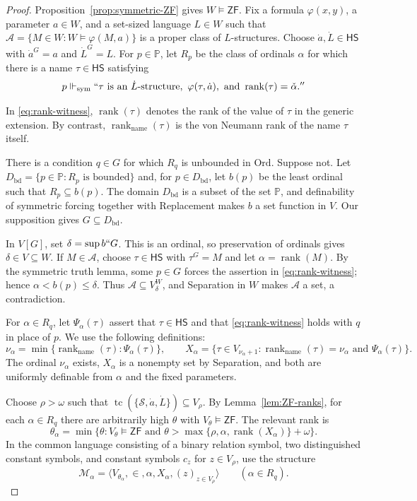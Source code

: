 \documentclass[11pt,a4paper]{amsart}
\newcommand{\ZF}{\mathsf{ZF}}
\newcommand{\HS}{\mathsf{HS}}
\newcommand{\Ord}{\mathrm{Ord}}
\newcommand{\tc}{\operatorname{tc}}
\newcommand{\rank}{\operatorname{rank}}
\newcommand{\namerank}{\operatorname{rank}_{\mathrm{name}}}
\newcommand{\forcesS}{\Vdash_{\mathrm{sym}}}
\theoremstyle{plain}
\theoremstyle{definition}
\theoremstyle{remark}
\begin{document}
\begin{proof}

Proposition~\ref{prop:symmetric-ZF} gives $W\models\ZF$.  Fix a formula $\varphi(x,y)$, a parameter $a\in W$, and a set-sized language $L\in W$ such that
$\mathcal A=\{M\in W:W\models\varphi(M,a)\}$ is a proper class of $L$-structures.  Choose $\dot a,\dot L\in\HS$ with $\dot a^G=a$ and $\dot L^G=L$.  For $p\in\mathbb P$, let $R_p$ be the class of ordinals $\alpha$ for which there is a name $\tau\in\HS$ satisfying
\begin{equation}\label{eq:rank-witness}
p\forcesS ``\tau\text{ is an }\dot L\text{-structure},\ \varphi(\tau,\dot a),
\text{ and }\rank(\tau)=\check\alpha.''
\end{equation}

{In \eqref{eq:rank-witness}, $\rank(\tau)$ denotes the rank of the value of $\tau$ in the generic extension.  By contrast, $\namerank(\tau)$ is the von Neumann rank of the name $\tau$ itself.}

There is a condition $q\in G$ for which $R_q$ is unbounded in $\Ord$.  Suppose not.  Let $D_{\mathrm{bd}}=\{p\in\mathbb P:R_p\text{ is bounded}\}$ and, for $p\in D_{\mathrm{bd}}$, let $b(p)$ be the least ordinal such that $R_p\subseteq b(p)$.  The domain $D_{\mathrm{bd}}$ is a subset of the set $\mathbb P$, and definability of symmetric forcing together with Replacement makes $b$ a set function in $V$.  Our supposition gives $G\subseteq D_{\mathrm{bd}}$.

In $V[G]$, set $\delta=\sup b``G$.  This is an ordinal, so preservation of ordinals gives $\delta\in V\subseteq W$.  If $M\in\mathcal A$, choose $\tau\in\HS$ with $\tau^G=M$ and let $\alpha=\rank(M)$.  By the symmetric truth lemma, some $p\in G$ forces the assertion in \eqref{eq:rank-witness}; hence $\alpha<b(p)\leq\delta$.  Thus $\mathcal A\subseteq V_\delta^W$, and Separation in $W$ makes $\mathcal A$ a set, a contradiction.

For $\alpha\in R_q$, let $\Psi_\alpha(\tau)$ assert that $\tau\in\HS$ and that \eqref{eq:rank-witness} holds with $q$ in place of $p$.  We use the following definitions:
\[
\nu_\alpha=\min\{\namerank(\tau):\Psi_\alpha(\tau)\},
\qquad
X_\alpha=\{\tau\in V_{\nu_\alpha+1}:\namerank(\tau)=\nu_\alpha
\text{ and }\Psi_\alpha(\tau)\}.
\]
{The ordinal $\nu_\alpha$ exists, $X_\alpha$ is a nonempty set by Separation, and both are uniformly definable from $\alpha$ and the fixed parameters.}

Choose $\rho>\omega$ such that $\tc(\{\mathscr S,\dot a,\dot L\})\subseteq V_\rho$.  By Lemma~\ref{lem:ZF-ranks}, for each $\alpha\in R_q$ there are arbitrarily high $\theta$ with $V_\theta\models\ZF$.  The relevant rank is
\[
\theta_\alpha=\min\bigl\{\theta:V_\theta\models\ZF\text{ and }
\theta>\max\{\rho,\alpha,\rank(X_\alpha)\}+\omega\bigr\}.
\]
In the common language consisting of a binary relation symbol, two distinguished constant symbols, and constant symbols $c_z$ for $z\in V_\rho$, use the structure
\[
\mathcal M_\alpha=
\bigl\langle V_{\theta_\alpha},\in,\alpha,X_\alpha,(z)_{z\in V_\rho}\bigr\rangle
\qquad(\alpha\in R_q).
\]


\end{proof}
\end{document}
